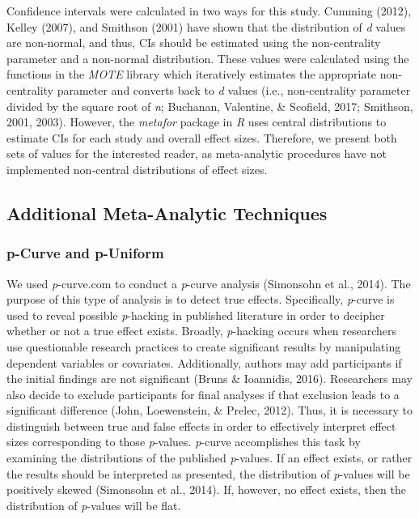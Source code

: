 \documentclass[,man]{apa6}
\begin{document}
Confidence intervals were calculated in two ways for this study. Cumming (2012), Kelley (2007), and Smithson (2001) have shown that the distribution of \emph{d} values are non-normal, and thus, CIs should be estimated using the non-centrality parameter and a non-normal distribution. These values were calculated using the functions in the \emph{MOTE} library which iteratively estimates the appropriate non-centrality parameter and converts back to \emph{d} values (i.e., non-centrality parameter divided by the square root of \emph{n}; Buchanan, Valentine, \& Scofield, 2017; Smithson, 2001, 2003). However, the \emph{metafor} package in \emph{R} uses central distributions to estimate CIs for each study and overall effect sizes. Therefore, we present both sets of values for the interested reader, as meta-analytic procedures have not implemented non-central distributions of effect sizes.

\hypertarget{additional-meta-analytic-techniques}{%
\subsection{Additional Meta-Analytic Techniques}\label{additional-meta-analytic-techniques}}

\hypertarget{p-curve-and-p-uniform}{%
\subsubsection{p-Curve and p-Uniform}\label{p-curve-and-p-uniform}}

We used \emph{p}-curve.com to conduct a \emph{p}-curve analysis (Simonsohn et al., 2014). The purpose of this type of analysis is to detect true effects. Specifically, \emph{p}-curve is used to reveal possible \emph{p}-hacking in published literature in order to decipher whether or not a true effect exists. Broadly, \emph{p}-hacking occurs when researchers use questionable research practices to create significant results by manipulating dependent variables or covariates. Additionally, authors may add participants if the initial findings are not significant (Bruns \& Ioannidis, 2016). Researchers may also decide to exclude participants for final analyses if that exclusion leads to a significant difference (John, Loewenstein, \& Prelec, 2012). Thus, it is necessary to distinguish between true and false effects in order to effectively interpret effect sizes corresponding to those \emph{p}-values. \emph{p}-curve accomplishes this task by examining the distributions of the published \emph{p}-values. If an effect exists, or rather the results should be interpreted as presented, the distribution of \emph{p}-values will be positively skewed (Simonsohn et al., 2014). If, however, no effect exists, then the distribution of \emph{p}-values will be flat.
\end{document}
